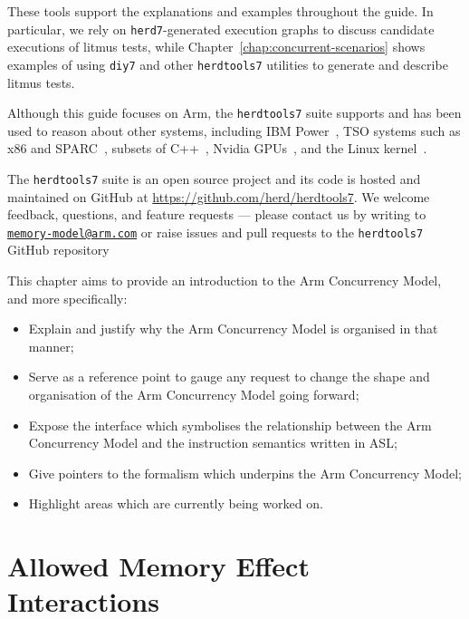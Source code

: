 \documentclass{book}
\begin{document}
These tools support the explanations and examples throughout the guide. In
particular, we rely on \texttt{herd7}-generated execution graphs to discuss
candidate executions of litmus tests, while
Chapter~\ref{chap:concurrent-scenarios} shows examples of using \texttt{diy7}
and other \texttt{herdtools7} utilities to generate and describe litmus tests.

Although this guide focuses on Arm, the \texttt{herdtools7} suite supports and
has been used to reason about other systems, including IBM
Power~\cite{alglave2010fences,alglave2014herding}, TSO systems such as x86 and
SPARC~\cite{alglave2014herding}, subsets of C++~\cite{alglave2014herding},
Nvidia GPUs~\cite{alglave2015gpu}, and the Linux
kernel~\cite{alglave2018linux}.

The \texttt{herdtools7} suite is an open source project and its code is hosted
and maintained on GitHub at \url{https://github.com/herd/herdtools7}. We welcome
feedback, questions, and feature requests — please contact us by writing to
\href{mailto:memory-model@arm.com}{\tt memory-model@arm.com} or raise issues and
pull requests to the \texttt{herdtools7} GitHub repository

This chapter aims to provide an introduction to the Arm Concurrency Model, and more specifically:
\begin{itemize}
\item Explain and justify why the Arm Concurrency Model is organised in that manner; 
\item Serve as a reference point to gauge any request to change the shape and organisation of the Arm Concurrency Model going forward; 
\item Expose the interface which symbolises the relationship between the Arm Concurrency Model and the instruction semantics written in ASL; 
\item Give pointers to the formalism which underpins the Arm Concurrency Model; 
\item Highlight areas which are currently being worked on. 
\end{itemize}

\section{Allowed Memory Effect Interactions}
\label{sec:allowed-memory-effect-interactions}
\end{document}
